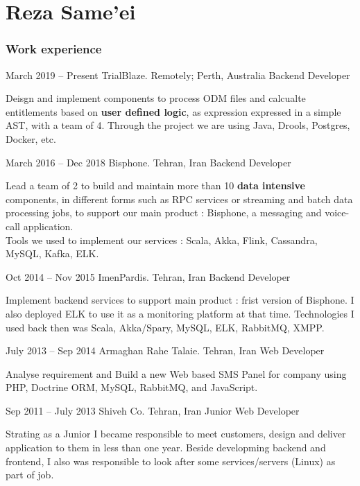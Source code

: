 \documentclass{tccv}
\begin{document}
\part{Reza Same'ei}

\section{Work experience}

\begin{eventlist}

\item{March 2019 -- Present}
     {TrialBlaze. Remotely; Perth, Australia}
     {Backend Developer}

    Deisgn and implement components to process ODM files and calcualte entitlements based on \textbf{user defined logic}, as expression expressed in a simple AST, with a team of 4. Through the project we are using Java, Drools, Postgres, Docker, etc.

\item{March 2016 -- Dec 2018}
     {Bisphone. Tehran, Iran}
     {Backend Developer}

    Lead a team of 2 to build and maintain more than 10 \textbf{data intensive} components, in different forms such as RPC services or streaming and batch data processing jobs, to support our main product : Bisphone, a messaging and voice-call application. \\Tools we used to implement our services : Scala, Akka, Flink, Cassandra, MySQL, Kafka, ELK.

\item{Oct 2014 -- Nov 2015}
     {ImenPardis. Tehran, Iran}
     {Backend Developer}

    Implement backend services to support main product : frist version of Bisphone. I also deployed ELK to use it as a monitoring platform at that time. Technologies I used back then was Scala, Akka/Spary, MySQL, ELK, RabbitMQ, XMPP.

\item{July 2013 -- Sep 2014}
     {Armaghan Rahe Talaie. Tehran, Iran}
     {Web Developer}

    Analyse requirement and Build a new Web based SMS Panel for company using PHP, Doctrine ORM, MySQL, RabbitMQ, and JavaScript.

\item{Sep 2011 -- July 2013}
     {Shiveh Co. Tehran, Iran}
     {Junior Web Developer}

    Strating as a Junior I became responsible to meet customers, design and deliver application to them in less than one year. Beside developming backend and frontend, I also was responsible to look after some services/servers (Linux) as part of job.

\end{eventlist}
\end{document}
